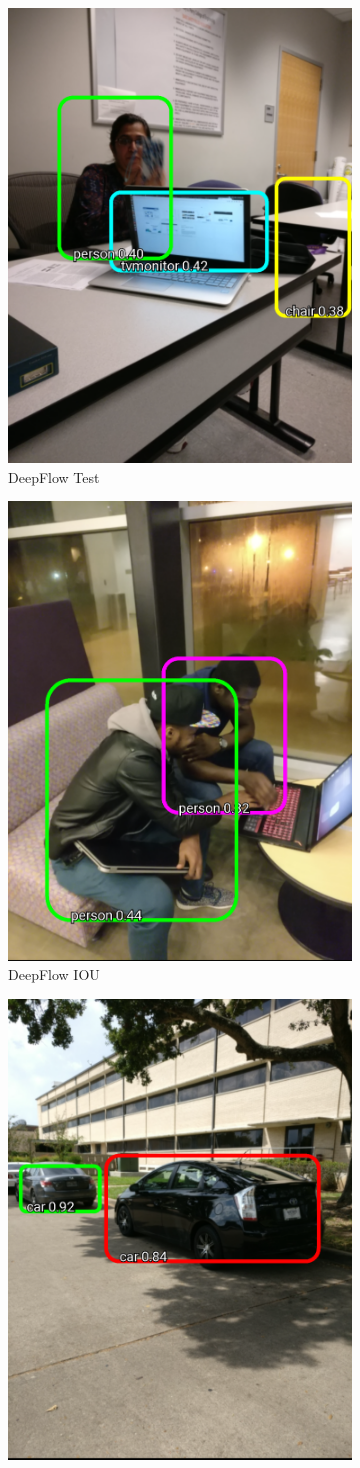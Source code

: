 \begin{figure}
\centering
\begin{subfigure}{.4\textwidth}
  \centering
  \includegraphics[width=.5\linewidth]{figures/test_4.png}
  \caption{DeepFlow Test}
  \label{fig:deepFlow_graph}
\end{subfigure}
\begin{subfigure}{.4\textwidth}
  \centering
  \includegraphics[width=.5\linewidth]{figures/test_1.png}
  \caption{DeepFlow IOU}
  \label{fig:DeepFlow_IOU}
\end{subfigure}
\begin{subfigure}{.4\textwidth}
  \centering
  \includegraphics[width=.5\linewidth]{figures/test_3.png}

\end{subfigure}
\end{figure}

